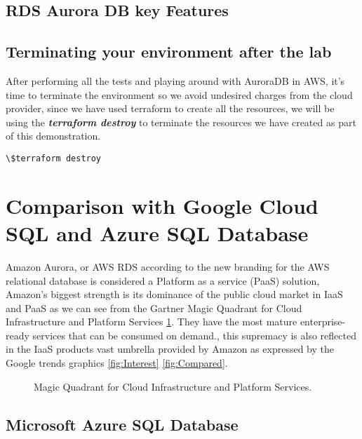 \documentclass{article}
\begin{document}
\subsection{RDS Aurora DB key Features}

\subsection{Terminating your environment after the lab}
After performing all the tests and playing around with AuroraDB in AWS, it's time to terminate the environment so we avoid undesired charges from the cloud provider, since we have used terraform to create all the resources, we will be using the \textbf{\emph{terraform destroy}} to terminate the resources we have created as part of this demonstration. 

\begin{lstlisting}[caption=Database Endpoint output]
\$terraform destroy
\end{lstlisting}

\section{Comparison with Google Cloud SQL and Azure SQL Database}

Amazon Aurora, or AWS RDS according to the new branding for the AWS relational database is considered a Platform as a service (PaaS) solution, Amazon’s biggest strength is its dominance of the public cloud market in IaaS and PaaS as we can see from the Gartner Magic Quadrant for Cloud Infrastructure and Platform Services \ref{fig:MagicQuadrant}. They have the most mature enterprise-ready services that can be consumed on demand.\cite{CloudPlatformComparision}, this supremacy is also reflected in the IaaS products vast umbrella provided by Amazon as expressed by the Google trends graphics \ref{fig:Interest} \ref{fig:Compared}.
\begin{figure}[hbt!]
\centering
\caption{\label{fig:MagicQuadrant} Magic Quadrant for Cloud Infrastructure and Platform Services.}
\end{figure}

\subsection{Microsoft Azure SQL Database}
\end{document}
